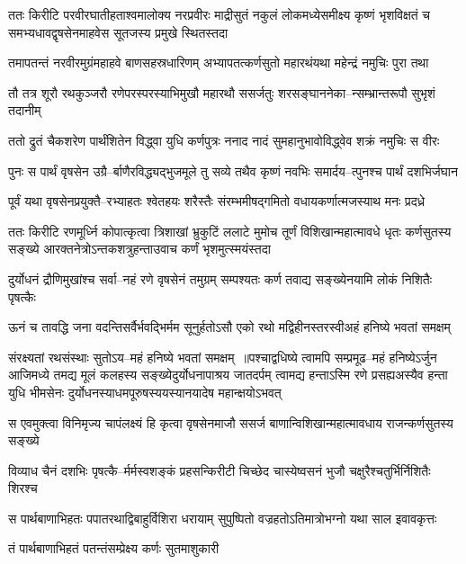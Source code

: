 \threelineshloka
{ततः किरीटि परवीरघातीहताश्वमालोक्य नरप्रवीरः}
{माद्रीसुतं नकुलं लोकमध्येसमीक्ष्य कृष्णं भृशविक्षतं च}
{समभ्यधावद्वृषसेनमाहवेस सूतजस्य प्रमुखे स्थितस्तदा}


\twolineshloka
{तमापतन्तं नरवीरमुग्रंमहाहवे बाणसहस्रधारिणम्}
{अभ्यापतत्कर्णसुतो महारथंयथा महेन्द्रं नमुचिः पुरा तथा}


\twolineshloka
{तौ तत्र शूरौ रथकुञ्जरौ रणेपरस्परस्याभिमुखौ महारथौ}
{ससर्जतुः शरसङ्घाननेका--न्सम्भ्रान्तरूपौ सुभृशं तदानीम्}


\twolineshloka
{ततो द्रुतं चैकशरेण पार्थंशितेन विद्ध्वा युधि कर्णपुत्रः}
{ननाद नादं सुमहानुभावोविद्ध्वेव शक्रं नमुचिः स वीरः}


\twolineshloka
{पुनः स पार्थं वृषसेन उग्रै--र्बाणैरविद्ध्यद्भुजमूले तु सव्ये}
{तथैव कृष्णं नवभिः समार्दय--त्पुनश्च पार्थं दशभिर्जघान}


\twolineshloka
{पूर्वं यथा वृषसेनप्रयुक्तै--रभ्याहतः श्वेतहयः शरैस्तैः}
{संरम्भमीषद्गमितो वधायकर्णात्मजस्याथ मनः प्रदध्रे}


\threelineshloka
{ततः किरीटि रणमूर्ध्नि कोपात्कृत्वा त्रिशाखां भ्रुकुटिं ललाटे}
{मुमोच तूर्णं विशिखान्महात्मावधे धृतः कर्णसुतस्य सङ्ख्ये}
{आरक्तनेत्रोऽन्तकशत्रुहन्ताउवाच कर्णं भृशमुत्स्मयंस्तदा}


\twolineshloka
{दुर्योधनं द्रौणिमुखांश्च सर्वा--नहं रणे वृषसेनं तमुग्रम्}
{सम्पश्यतः कर्ण तवाद्य सङ्ख्येनयामि लोकं निशितैः पृषत्कैः}


\twolineshloka
{ऊनं च तावद्धि जना वदन्तिसर्वैर्भवद्भिर्मम सूनुर्हतोऽसौ}
{एको रथो मद्विहीनस्तरस्वीअहं हनिष्ये भवतां समक्षम्}


संरक्ष्यतां रथसंस्थाः सुतोऽय--महं हनिष्ये भवतां समक्षम् ॥पश्चाद्वधिष्ये त्वामपि सम्प्रमूढ--महं हनिष्येऽर्जुन आजिमध्ये
\threelineshloka
{तमद्य मूलं कलहस्य सङ्ख्येदुर्योधनापाश्रय जातदर्पम्}
{त्वामद्य हन्ताऽस्मि रणे प्रसह्यअस्यैव हन्ता युधि भीमसेनः}
{दुर्योधनस्याधमपूरुषस्ययस्यानयादेष महान्क्षयोऽभवत्}


\twolineshloka
{स एवमुक्त्वा विनिमृज्य चापंलक्ष्यं हि कृत्वा वृषसेनमाजौ}
{ससर्ज बाणान्विशिखान्महात्मावधाय राजन्कर्णसुतस्य सङ्ख्ये}


\twolineshloka
{विव्याध चैनं दशभिः पृषत्कै--र्मर्मस्वशङ्कं प्रहसन्किरीटी}
{चिच्छेद चास्येष्वसनं भुजौ चक्षुरैश्चतुर्भिर्निशितैः शिरश्च}


\twolineshloka
{स पार्थबाणाभिहतः पपातरथाद्विबाहुर्विशिरा धरायाम्}
{सुपुष्पितो वज्रहतोऽतिमात्रोभग्नो यथा साल इवावकृत्तः}


तं पार्थबाणाभिहतं पतन्तंसम्प्रेक्ष्य कर्णः सुतमाशुकारी

